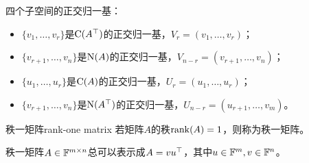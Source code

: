 \begin{corollary}
	四个子空间的正交归一基：
	\begin{itemize}
		\item $\{v_1,\ldots,v_r\}$是$\operatorname{C}(A^\top)$的正交归一基，$V_r=(v_1,\ldots,v_r)$；
		\item $\{v_{r+1},\ldots,v_n\}$是$\operatorname{N}(A)$的正交归一基，$V_{n-r}=(v_{r+1},\ldots,v_n)$；
		\item $\{u_1,\ldots,u_r\}$是$\operatorname{C}(A)$的正交归一基，$U_r=(u_1,\ldots,u_r)$；
		\item $\{v_{r+1},\ldots,v_n\}$是$\operatorname{N}(A^\top)$的正交归一基，$U_{n-r}=(u_{r+1},\ldots,v_m)$。
	\end{itemize}
\end{corollary}

\begin{definition}
	{秩一矩阵}{rank-one matrix}
	若矩阵$A$的秩$\operatorname{rank}(A)=1$，则称为秩一矩阵。
\end{definition}

\begin{remark}
	秩一矩阵$A\in\mathbb F^{m\times n}$总可以表示成$A=vu^\top$，其中$u\in\mathbb F^m,v\in\mathbb F^n$。
\end{remark}

